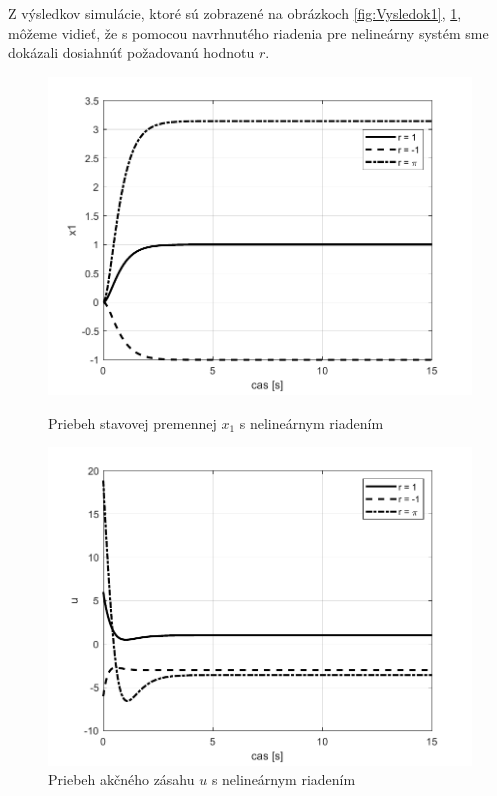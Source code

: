 \documentclass[../main.tex]{subfiles}
\begin{document}
Z výsledkov simulácie, ktoré sú zobrazené na obrázkoch \ref{fig:Vysledok1}, \ref{fig:Vysledok2}, môžeme vidieť, že s pomocou navrhnutého riadenia pre nelineárny systém sme dokázali dosiahnúť požadovanú hodnotu $r$.
\begin{figure}[!htb]
   \begin{minipage}{0.46\textwidth}
     \centering
     \includegraphics[width=1\linewidth]{x.pdf}
     \caption{Priebeh stavovej premennej $x_1$ s nelineárnym riadením}
	\label{fig:Vysledok1}
   \end{minipage}\hfill
   \begin{minipage}{0.46\textwidth}
     \centering
     \includegraphics[width=1\linewidth]{u.pdf}
     \caption{Priebeh akčného zásahu $u$ s nelineárnym riadením}
	\label{fig:Vysledok2}
   \end{minipage}
\end{figure}
\end{document}
